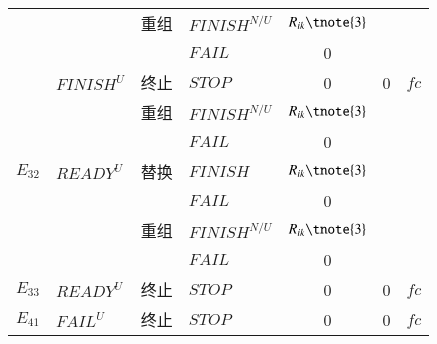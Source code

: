 \begin{table}[htbp]
\begin{threeparttable}
\begin{tabular}{clclccc}
        {}
        & {}
        & {重组} 
        & {$FINISH^{N/U}$} 
        & $R_{ik}\tnote{3}$ 
        & {\multirow{2}{*}{$T_{i0}+\sum\limits_{x = i}^j {({T_{xk}} - {T_{x0}})} $}}
        & {\multirow{2}{*}{$C_{i0}+\sum\limits_{x = i}^j {({C_{xk}} - {C_{x0}})} $}} \\
        
        
        {}
        & {}
        & {} 
        & {$FAIL$} 
        & {0}
        & {} 
        & {} \\
        
        {} 
        & {${FINISH^U}$}
        & {终止}
        & {$STOP$} 
        & {0} 
        & {0} 
        & {$fc$} \\
        
        {}
        & {}
        & {重组} 
        & {$FINISH^{N/U}$} 
        & $R_{ik}\tnote{3}$ 
        & {\multirow{2}{*}{$\sum\limits_{x = i}^j {({T_{xk}} - {T_{x0}})} $}}
        & {\multirow{2}{*}{$\sum\limits_{x = i}^j {({C_{xk}} - {C_{x0}})} $}} \\
        
        
        {}
        & {}
        & {} 
        & {$FAIL$} 
        & {0}
        & {} 
        & {} \\
        {$E_{32}$} 
        & {$READY^U$}
        & {替换} 
        & {$FINISH$} 
        & $R_{ik}\tnote{3}$ 
        & {\multirow{2}{*}{$T_{ik}-T_{i0}$}} 
        & {\multirow{2}{*}{$C_{ik}-C_{i0}$}} \\
        
        {}
        & {}
        & {} 
        & {$FAIL$} 
        & {0}
        & {} 
        & {} \\
        
        {}
        & {}
        & {重组} 
        & {$FINISH^{N/U}$} 
        & $R_{ik}\tnote{3}$ 
        & {\multirow{2}{*}{$\sum\limits_{x = i}^j {({T_{xk}} - {T_{x0}})} $}}
        & {\multirow{2}{*}{$\sum\limits_{x = i}^j {({C_{xk}} - {C_{x0}})} $}} \\
        
        
        {}
        & {}
        & {} 
        & {$FAIL$} 
        & {0}
        & {} 
        & {} \\
        
        {$E_{33}$} 
        & {${READY^U}$}
        & {终止}
        & {$STOP$} 
        & {0} 
        & {0} 
        & {$fc$} \\
        {$E_{41}$} 
        & {${FAIL^U}$}
        & {终止}
        & {$STOP$} 
        & {0} 
        & {0} 
        & {$fc$} \\
        

\end{tabular}
\end{threeparttable}
\end{table}
